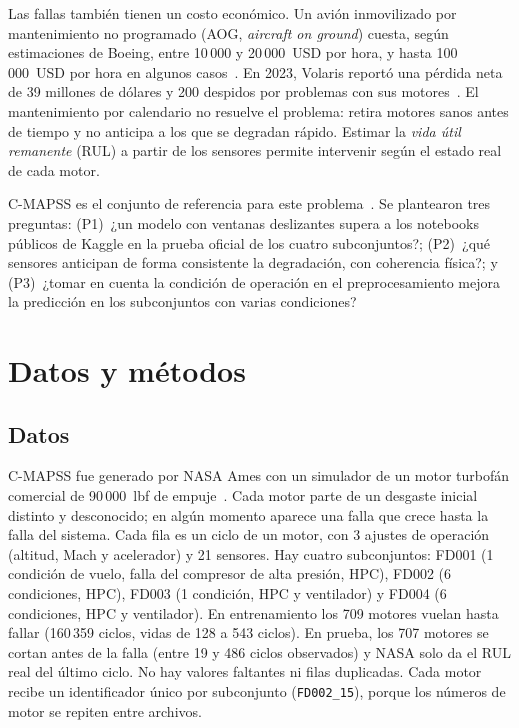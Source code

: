 \documentclass[conference]{IEEEtran}
\begin{document}
Las fallas también tienen un costo económico. Un avión inmovilizado por mantenimiento no programado (AOG, \emph{aircraft on ground}) cuesta, según estimaciones de Boeing, entre 10\,000 y 20\,000~USD por hora, y hasta 100\,000~USD por hora en algunos casos~\cite{flyingaog}. En 2023, Volaris reportó una pérdida neta de 39 millones de dólares y 200 despidos por problemas con sus motores~\cite{volaris}. El mantenimiento por calendario no resuelve el problema: retira motores sanos antes de tiempo y no anticipa a los que se degradan rápido. Estimar la \emph{vida útil remanente} (RUL) a partir de los sensores permite intervenir según el estado real de cada motor.

C-MAPSS es el conjunto de referencia para este problema~\cite{vollert}. Se plantearon tres preguntas: (P1)~¿un modelo con ventanas deslizantes supera a los notebooks públicos de Kaggle en la prueba oficial de los cuatro subconjuntos?; (P2)~¿qué sensores anticipan de forma consistente la degradación, con coherencia física?; y (P3)~¿tomar en cuenta la condición de operación en el preprocesamiento mejora la predicción en los subconjuntos con varias condiciones?

\section{Datos y métodos}

\subsection{Datos}
C-MAPSS fue generado por NASA Ames con un simulador de un motor turbofán comercial de 90\,000~lbf de empuje~\cite{saxena2008,saxenadata}. Cada motor parte de un desgaste inicial distinto y desconocido; en algún momento aparece una falla que crece hasta la falla del sistema. Cada fila es un ciclo de un motor, con 3 ajustes de operación (altitud, Mach y acelerador) y 21 sensores. Hay cuatro subconjuntos: FD001 (1 condición de vuelo, falla del compresor de alta presión, HPC), FD002 (6 condiciones, HPC), FD003 (1 condición, HPC y ventilador) y FD004 (6 condiciones, HPC y ventilador). En entrenamiento los 709 motores vuelan hasta fallar (160\,359 ciclos, vidas de 128 a 543 ciclos). En prueba, los 707 motores se cortan antes de la falla (entre 19 y 486 ciclos observados) y NASA solo da el RUL real del último ciclo. No hay valores faltantes ni filas duplicadas. Cada motor recibe un identificador único por subconjunto (\texttt{FD002\_15}), porque los números de motor se repiten entre archivos.
\end{document}
